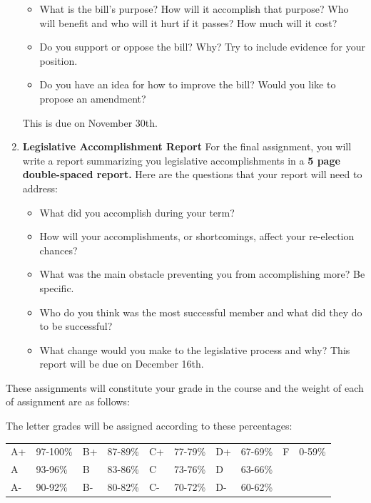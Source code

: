 \documentclass[11pt]{article}
\begin{document}
\begin{enumerate}
\begin{itemize}
					\item What is the bill's purpose? How will it accomplish that purpose? Who will benefit and who will it hurt if it passes? How much will it cost?
					\item Do you support or oppose the bill? Why? Try to include evidence for your position. 
					\item Do you have an idea for how to improve the bill? Would you like to propose an amendment?
				\end{itemize} {\color{red} This is due on November 30th.}
				\item \textbf{Legislative Accomplishment Report} For the final assignment, you will write a report summarizing you legislative accomplishments in a \textbf{5 page double-spaced report.} Here are the questions that your report will need to address:
				\begin{itemize}
					\item What did you accomplish during your term?
					\item How will your accomplishments, or shortcomings, affect your re-election chances?
					\item What was the main obstacle preventing you from accomplishing more? Be specific.
					\item Who do you think was the most successful member and what did they do to be successful?
					\item What change would you make to the legislative process and why?
					{\color{red} This report will be due on December 16th.}
				\end{itemize}
\end{enumerate}

These assignments will constitute your grade in the course and the weight of each of assignment are as follows:

\begin{center}
\end{center}

The letter grades will be assigned according to these percentages:

\begin{center}
	\begin{tabular}{ l l l l l l l l l l}
		\toprule
 		A+ & 97-100\% & B+ & 87-89\% & C+ & 77-79\% & D+ & 67-69\% & F & 0-59\% \\
		A & 93-96\% & B & 83-86\% & C & 73-76\% & D & 63-66\% \\
		A- & 90-92\% & B- & 80-82\% & C- & 70-72\% & D- & 60-62\% \\
		\bottomrule    
	\end{tabular}
\end{center}
\end{document}
